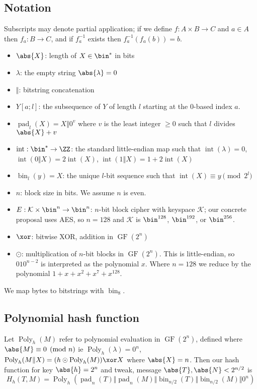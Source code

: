 \documentclass[letterpaper,11pt]{article}
\newcommand*{\Concat}{\Vert}
\DeclareMathOperator{\GF}{GF}
\DeclareMathOperator{\fromint}{bin}
\DeclareMathOperator{\intify}{int}
\DeclareMathOperator{\pad}{pad}
\DeclareMathOperator{\Poly}{Poly}
\begin{document}
\subsection{Notation}
Subscripts may denote partial application; if we define $f: A \times B \rightarrow C$ and
$a \in A$ then $f_a: B \rightarrow C$, and if $f_a^{-1}$ exists then $f_a^{-1}(f_a(b)) = b$.
\begin{itemize}
    \item $\abs{X}$: length of $X \in \bin^{*}$ in bits
    \item $\lambda$: the empty string $\abs{\lambda} = 0$
    \item $\Concat$: bitstring concatenation
    \item $Y[a;l]$: the subsequence of $Y$ of length $l$ starting at the 0-based index $a$.
    \item $\pad_l(X) = X \Concat 0^v$
    where $v$ is the least integer $\geq 0$ such that $l$ divides $\abs{X} + v$
    \item $\intify: \bin^{*} \rightarrow \ZZ$: the
    standard little-endian map such that
    $\intify(\lambda) = 0$, $\intify(0 \Concat X) = 2\intify(X)$, $\intify(1 \Concat X) = 1 + 2\intify(X)$
    \item $\fromint_l(y) = X$: the unique
    $l$-bit sequence such that $\intify(X) \equiv y \pmod{2^l}$
    \item \(n\): block size in bits. We assume \(n\) is even.
    \item \(E: \mathcal{K} \times \bin^n \rightarrow \bin^n\): 
    \(n\)-bit block cipher with keyspace \(\mathcal{K}\);
    our concrete proposal uses AES, so \(n=128\) and \(\mathcal{K}\) is
    \(\bin^{128}\), \(\bin^{192}\), or \(\bin^{256}\). 
    \item \(\xor\): bitwise XOR, addition in \(\GF(2^n)\)
    \item \(\odot\): multiplication of \(n\)-bit blocks in \(\GF(2^n)\).
    This is little-endian, so \(010^{n-2}\) is interpreted as the
    polynomial \(x\). Where \(n=128\) we reduce by the polynomial
    \(1 + x + x^2 + x^7 + x^{128}\).
\end{itemize}
We map bytes to bitstrings with \(\fromint_8\).

\subsection{Polynomial hash function}

Let \(\Poly_h(M)\) refer to polynomial evaluation in \(\GF(2^n)\),
defined where \(\abs{M} \equiv 0 \pmod n\) ie
\(\Poly_h(\lambda) = 0^n\), \(\Poly_h(M \Concat X) = (h \odot \Poly_h(M)) \xor X\) 
where \(\abs{X} = n\).
Then our hash function for key \(\abs{h} = 2^n\)
and tweak, message \(\abs{T}, \abs{N} < 2^{n/2}\) is
\begin{displaymath}
    H_h(T, M) = \Poly_h(\pad_n(T) \Concat \pad_n(M) \Concat \fromint_{n/2}(T) \Concat \fromint_{n/2}(M) \Concat 0^n)
\end{displaymath}
\end{document}
